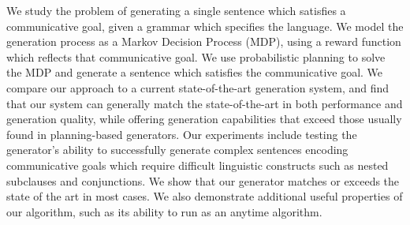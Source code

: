 %
%
%

\noindent       %
  We study the problem of generating a single sentence which satisfies
  a communicative goal, given a grammar which specifies the language.
  We model the generation process as a Markov Decision Process (MDP),
  using a reward function which reflects that communicative goal.  We use
  probabilistic planning to solve the MDP and generate a sentence which
  satisfies the communicative goal.  We compare our approach to a current
  state-of-the-art generation system, and find that our system can generally
  match the state-of-the-art in both performance and generation quality, while
  offering generation capabilities that exceed those usually found in planning-based
  generators.  Our experiments include testing the generator's ability to
  successfully generate complex sentences encoding communicative goals which
  require difficult linguistic constructs such as nested subclauses and conjunctions.  We
  show that our generator matches or exceeds the state of the art in most cases.
  We also demonstrate additional useful properties of our algorithm, such as its
  ability to run as an anytime algorithm.